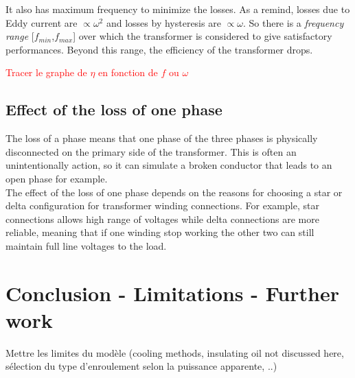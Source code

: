 \documentclass[12pt,a4paper]{report}
\begin{document}
It also has maximum frequency to minimize the losses. As a remind, losses due to Eddy current are $\propto \omega^2$ and losses by hysteresis are $\propto \omega$. So there is a \textit{frequency range} [$f_{min}$,$f_{max}$] over which the transformer is considered to give satisfactory performances. Beyond this range, the efficiency of the transformer drops.

\textcolor{red}{Tracer le graphe de $\eta$ en fonction de $f$ ou $\omega$}

\subsection{Effect of the loss of one phase}
The loss of a phase means that one phase of the three phases is physically disconnected on the primary side of the transformer. This is often an unintentionally action, so it can simulate a broken conductor that leads to an open phase for example.\\

The effect of the loss of one phase depends on the reasons for choosing a star or delta configuration for transformer winding connections. For example, star connections allows high range of voltages while delta connections are more reliable, meaning that if one winding stop working the other two can still maintain full line voltages to the load.

\section{Conclusion - Limitations - Further work}
Mettre les limites du modèle (cooling methods, insulating oil not discussed here, sélection du type d'enroulement selon la puissance apparente, ..)
\end{document}
